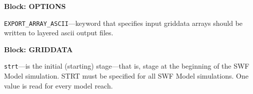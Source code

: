 
\item \textbf{Block: OPTIONS}

\begin{description}
\item \texttt{EXPORT\_ARRAY\_ASCII}---keyword that specifies input griddata arrays should be written to layered ascii output files.

\end{description}
\item \textbf{Block: GRIDDATA}

\begin{description}
\item \texttt{strt}---is the initial (starting) stage---that is, stage at the beginning of the SWF Model simulation.  STRT must be specified for all SWF Model simulations. One value is read for every model reach.

\end{description}

